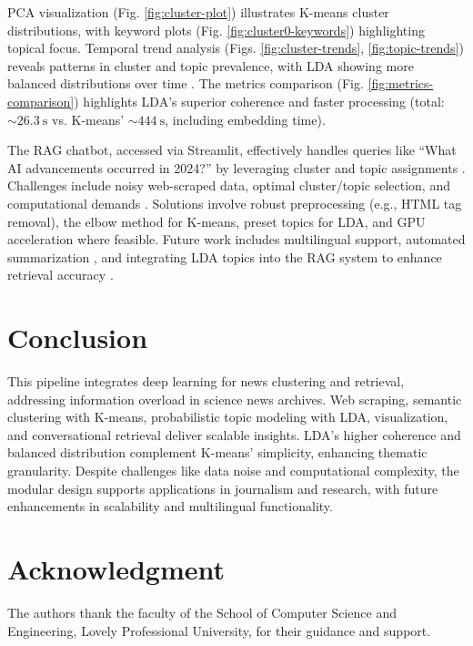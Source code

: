 \documentclass[conference]{IEEEtran}
\begin{document}
PCA visualization (Fig. \ref{fig:cluster-plot}) illustrates K-means cluster distributions, with keyword plots (Fig. \ref{fig:cluster0-keywords}) highlighting topical focus. Temporal trend analysis (Figs. \ref{fig:cluster-trends}, \ref{fig:topic-trends}) reveals patterns in cluster and topic prevalence, with LDA showing more balanced distributions over time \cite{wei2010lda}. The metrics comparison (Fig. \ref{fig:metrics-comparison}) highlights LDA’s superior coherence and faster processing (total: $\sim\SI{26.3}{\second}$ vs. K-means’ $\sim\SI{444}{\second}$, including embedding time).

The RAG chatbot, accessed via Streamlit, effectively handles queries like ``What AI advancements occurred in 2024?'' by leveraging cluster and topic assignments \cite{radford2019language}. Challenges include noisy web-scraped data, optimal cluster/topic selection, and computational demands \cite{allahyari2017text}. Solutions involve robust preprocessing (e.g., HTML tag removal), the elbow method for K-means, preset topics for LDA, and GPU acceleration where feasible. Future work includes multilingual support, automated summarization \cite{lin-2004-rouge}, and integrating LDA topics into the RAG system to enhance retrieval accuracy \cite{devlin2019bert}.

\section{Conclusion}
This pipeline integrates deep learning for news clustering and retrieval, addressing information overload in science news archives. Web scraping, semantic clustering with K-means, probabilistic topic modeling with LDA, visualization, and conversational retrieval deliver scalable insights. LDA’s higher coherence and balanced distribution complement K-means’ simplicity, enhancing thematic granularity. Despite challenges like data noise and computational complexity, the modular design supports applications in journalism and research, with future enhancements in scalability and multilingual functionality.

\section*{Acknowledgment}
The authors thank the faculty of the School of Computer Science and Engineering, Lovely Professional University, for their guidance and support.



\end{document}
